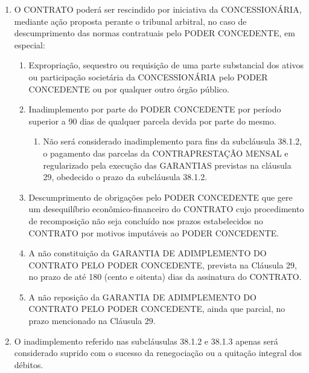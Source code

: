 \documentclass[a4paper,11pt]{report} %
\begin{document}
\begin{enumerate}
\item \label{itm:35BR} O CONTRATO poderá ser rescindido por iniciativa da CONCESSIONÁRIA, mediante ação proposta perante o tribunal arbitral, no caso de descumprimento das normas contratuais pelo PODER CONCEDENTE, em especial:

\begin{enumerate}[label*=\arabic*.]
\item \label{itm:AETL} Expropriação, sequestro ou requisição de uma parte substancial dos ativos ou participação societária da CONCESSIONÁRIA pelo PODER CONCEDENTE ou por qualquer outro órgão público.

\item \label{itm:SMBZ} Inadimplemento por parte do PODER CONCEDENTE por período superior a 90 dias de qualquer parcela devida por parte do mesmo.

\begin{enumerate}[label*=\arabic*.]
\item \label{itm:77HD} Não será considerado inadimplemento para fins da subcláusula 38.1.2, o pagamento das parcelas da CONTRAPRESTAÇÃO MENSAL e regularizado pela execução das GARANTIAS previstas na cláusula 29, obedecido o prazo da subcláusula 38.1.2.
\end{enumerate}

\item \label{itm:NQT6} Descumprimento de obrigações pelo PODER CONCEDENTE que gere um desequilíbrio econômico-financeiro do CONTRATO cujo procedimento de recomposição não seja concluído nos prazos estabelecidos no CONTRATO por motivos imputáveis ao PODER CONCEDENTE.

\item \label{itm:FCV3} A não constituição da GARANTIA DE ADIMPLEMENTO DO CONTRATO PELO PODER CONCEDENTE, prevista na Cláusula 29, no prazo de até 180 (cento e oitenta) dias da assinatura do CONTRATO.

\item \label{itm:PKVW} A não reposição da GARANTIA DE ADIMPLEMENTO DO CONTRATO PELO PODER CONCEDENTE, ainda que parcial, no prazo mencionado na Cláusula 29. 
\end{enumerate}

\item \label{itm:7K7R} O inadimplemento referido nas subcláusulas 38.1.2 e 38.1.3 apenas será considerado suprido com o sucesso da renegociação ou a quitação integral dos débitos.


\end{enumerate}
\end{document}
